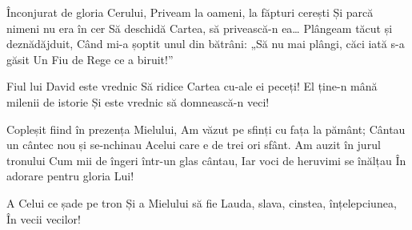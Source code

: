 \beginverse
Înconjurat de gloria Cerului,
Priveam la oameni, la făpturi cerești
Și parcă nimeni nu era în cer
Să deschidă Cartea, să privească-n ea…
Plângeam tăcut și deznădăjduit,
Când mi-a șoptit unul din bătrâni:
„Să nu mai plângi, căci iată s-a găsit
Un Fiu de Rege ce a biruit!”
\endverse

\beginchorus
Fiul lui David este vrednic
Să ridice Cartea cu-ale ei peceți!
El ține-n mână milenii de istorie
Și este vrednic să domnească-n veci!
\endchorus

\beginverse
Copleșit fiind în prezența Mielului,
Am văzut pe sfinți cu fața la pământ;
Cântau un cântec nou și se-nchinau
Acelui care e de trei ori sfânt.
Am auzit în jurul tronului
Cum mii de îngeri într-un glas cântau,
Iar voci de heruvimi se înălțau
În adorare pentru gloria Lui!
\endverse

\beginchorus
A Celui ce șade pe tron
Și a Mielului să fie
Lauda, slava, cinstea, înțelepciunea,
În vecii vecilor!
\endchorus
\endsong